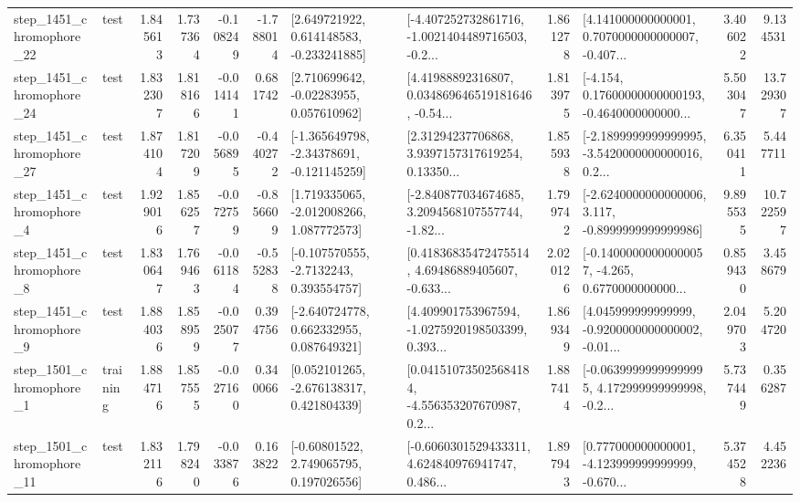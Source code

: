 \begin{tabular}{llrrrrllrlrr}
 step\_1451\_chromophore\_22 &      test &      1.845613 &    1.737364 &     -0.108249 & -1.788014 &    [2.649721922, 0.614148583, -0.233241885] &  [-4.407252732861716, -1.0021404489716503, -0.2... &       1.861278 &  [4.141000000000001, 0.7070000000000007, -0.407... &            3.406022 &          9.134531 \\
 step\_1451\_chromophore\_24 &      test &      1.832307 &    1.818166 &     -0.014141 &  0.681742 &     [2.710699642, -0.02283955, 0.057610962] &  [4.41988892316807, 0.034869646519181646, -0.54... &       1.813975 &  [-4.154, 0.17600000000000193, -0.4640000000000... &            5.503047 &         13.729307 \\
 step\_1451\_chromophore\_27 &      test &      1.874104 &    1.817209 &     -0.056895 & -0.440272 &   [-1.365649798, -2.34378691, -0.121145259] &  [2.31294237706868, 3.9397157317619254, 0.13350... &       1.855938 &  [-2.1899999999999995, -3.5420000000000016, 0.2... &            6.350411 &          5.447711 \\
  step\_1451\_chromophore\_4 &      test &      1.929016 &    1.856257 &     -0.072759 & -0.856609 &    [1.719335065, -2.012008266, 1.087772573] &  [-2.840877034674685, 3.2094568107557744, -1.82... &       1.799742 &  [-2.6240000000000006, 3.117, -0.8999999999999986] &            9.895535 &         10.722597 \\
  step\_1451\_chromophore\_8 &      test &      1.830647 &    1.769463 &     -0.061184 & -0.552838 &     [-0.107570555, -2.7132243, 0.393554757] &  [0.41836835472475514, 4.69486889405607, -0.633... &       2.020126 &  [-0.14000000000000057, -4.265, 0.6770000000000... &            0.859430 &          3.458679 \\
  step\_1451\_chromophore\_9 &      test &      1.884036 &    1.858959 &     -0.025077 &  0.394756 &    [-2.640724778, 0.662332955, 0.087649321] &  [4.409901753967594, -1.0275920198503399, 0.393... &       1.869349 &  [4.045999999999999, -0.9200000000000002, -0.01... &            2.049703 &          5.204720 \\
  step\_1501\_chromophore\_1 &  training &      1.884716 &    1.857555 &     -0.027160 &  0.340066 &    [0.052101265, -2.676138317, 0.421804339] &  [0.041510735025684184, -4.556353207670987, 0.2... &       1.887414 &  [-0.06399999999999995, 4.172999999999998, -0.2... &            5.737449 &          0.356287 \\
 step\_1501\_chromophore\_11 &      test &      1.832116 &    1.798240 &     -0.033876 &  0.163822 &     [-0.60801522, 2.749065795, 0.197026556] &  [-0.6060301529433311, 4.624840976941747, 0.486... &       1.897943 &  [0.777000000000001, -4.123999999999999, -0.670... &            5.374528 &          4.452236 \\

\end{tabular}
